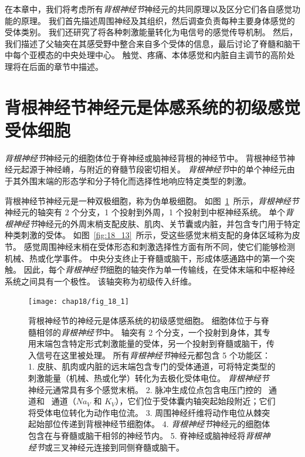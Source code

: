 在本章中，我们将考虑所有\textit{背根神经节}神经元的共同原理以及区分它们各自感觉功能的原理。
我们首先描述周围神经及其组织，然后调查负责每种主要身体感觉的受体类别。
我们还研究了将各种刺激能量转化为电信号的感觉传导机制。
然后，我们描述了父轴突在其感受野中整合来自多个受体的信息，最后讨论了脊髓和脑干中每个亚模态的中央处理中心。
触觉、疼痛、本体感觉和内脏自主调节的高阶处理将在后面的章节中描述。



\section{背根神经节神经元是体感系统的初级感觉受体细胞}

\textit{背根神经节}神经元的细胞体位于脊神经或脑神经背根的神经节中。
背根神经节神经元起源于神经嵴，与附近的脊髓节段密切相关。
\textit{背根神经节}中的单个神经元由于其外围末端的形态学和分子特化而选择性地响应特定类型的刺激。


背根神经节神经元是一种双极细胞，称为伪单极细胞。 
如图~\ref{fig:18_1}~所示，\textit{背根神经节}神经元的轴突有 2 个分支，1 个投射到外周，1 个投射到中枢神经系统。
单个\textit{背根神经节}神经元的外周末梢支配皮肤、肌肉、关节囊或内脏，并包含专门用于特定种类刺激的受体。 
如图~\ref{fig:18_13}~所示，受这些感觉末梢支配的身体区域称为皮节。
感觉周围神经末梢在受体形态和刺激选择性方面有所不同，使它们能够检测机械、热或化学事件。
中央分支终止于脊髓或脑干，形成体感通路中的第一个突触。
因此，每个\textit{背根神经节}细胞的轴突作为单一传输线，在受体末端和中枢神经系统之间具有一个极性。
该轴突称为初级传入纤维。


\begin{figure}[htbp]
	\centering
	\texttt{[image: chap18/fig\_18\_1]}
	\caption{背根神经节的神经元是体感系统的初级感觉细胞。
		细胞体位于与脊髓相邻的\textit{背根神经节}中。
		轴突有 2 个分支，一个投射到身体，其专用末端包含特定形式刺激能量的受体，另一个投射到脊髓或脑干，传入信号在这里被处理。
		所有\textit{背根神经节}神经元都包含 5 个功能区：
		1. 皮肤、肌肉或内脏的远末端包含专门的受体通道，可将特定类型的刺激能量（机械、热或化学）转化为去极化受体电位。
		\textit{背根神经节}神经元通常具有多个感觉末梢。
		2. 脉冲生成位点包含电压门控的~ 通道和~ 通道（$Na_V$ 和 $K_V$），它们位于受体囊内轴突起始段附近；它们将受体电位转化为动作电位流。
		3. 周围神经纤维将动作电位从棘突起始部位传递到背根神经节细胞体。 
		4. \textit{背根神经节}神经元的细胞体包含在与脊髓或脑干相邻的神经节内。 
		5. 脊神经或脑神经将\textit{背根神经节}或三叉神经元连接到同侧脊髓或脑干。}
	\label{fig:18_1}
\end{figure}


